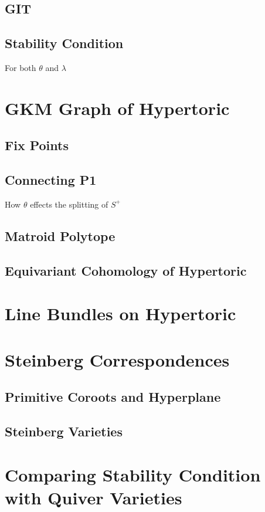 \documentclass[b5paper]{article}
\begin{document}
\subsection{GIT}
\subsection{Stability Condition}
For both $\theta$ and $\lambda$
\section{GKM Graph of Hypertoric}
\subsection{Fix Points}
\subsection{Connecting P1}
How $\theta$ effects the splitting of $S^+$
\subsection{Matroid Polytope}
\subsection{Equivariant Cohomology of Hypertoric}
\section{Line Bundles on Hypertoric}
\section{Steinberg Correspondences}
\subsection{Primitive Coroots and Hyperplane}
\subsection{Steinberg Varieties}

\section{Comparing Stability Condition with Quiver Varieties}

\appendix


%
%
\end{document}
